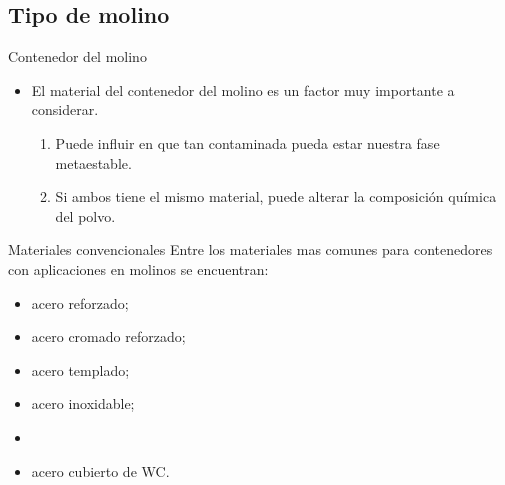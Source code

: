 \documentclass[%
spanish,
progressbar=head,
background=dark,
subsectionpage,
aspectratio=169
]{beamer}
\begin{document}
\subsection{Tipo de molino}

\begin{frame}{Contenedor del molino}
\begin{itemize}
    \item El material del contenedor del molino es un factor muy importante a considerar.
    \begin{enumerate}
        \item Puede influir en que tan contaminada pueda estar nuestra fase metaestable.
        \item Si ambos tiene el mismo material, puede alterar la composición química del polvo.
    \end{enumerate}
\end{itemize}
\end{frame}

\begin{frame}{Materiales convencionales}
    Entre los materiales mas comunes para contenedores con aplicaciones en molinos se encuentran:
    \begin{itemize}
        \item acero reforzado;
        \item acero cromado reforzado;
        \item acero templado;
        \item acero inoxidable;
        \item {}
        \item acero cubierto de WC.
    \end{itemize}
\end{frame}
\end{document}
